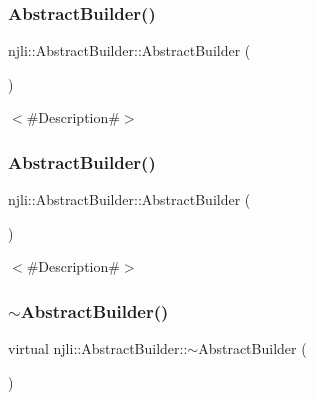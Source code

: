 \subsubsection{\texorpdfstring{Abstract\+Builder()}{AbstractBuilder()}\hspace{0.1cm}{\footnotesize\ttfamily [1/2]}}
{\footnotesize\ttfamily njli\+::\+Abstract\+Builder\+::\+Abstract\+Builder (\begin{DoxyParamCaption}{ }\end{DoxyParamCaption})}

$<$\#\+Description\#$>$ \mbox{\label{classnjli_1_1_abstract_builder_a5e86ed88487717e88be16728662f2964}} 
\subsubsection{\texorpdfstring{Abstract\+Builder()}{AbstractBuilder()}\hspace{0.1cm}{\footnotesize\ttfamily [2/2]}}
{\footnotesize\ttfamily njli\+::\+Abstract\+Builder\+::\+Abstract\+Builder (\begin{DoxyParamCaption}\item[{const \mbox{\hyperlink{classnjli_1_1_abstract_builder}{Abstract\+Builder}} \&}]{ }\end{DoxyParamCaption})}

$<$\#\+Description\#$>$ \mbox{\label{classnjli_1_1_abstract_builder_a29a886b06975345f3a35d6f7eb49c0ed}} 
\subsubsection{\texorpdfstring{$\sim$\+Abstract\+Builder()}{~AbstractBuilder()}}
{\footnotesize\ttfamily virtual njli\+::\+Abstract\+Builder\+::$\sim$\+Abstract\+Builder (\begin{DoxyParamCaption}{ }\end{DoxyParamCaption})\hspace{0.3cm}{\ttfamily [virtual]}}

